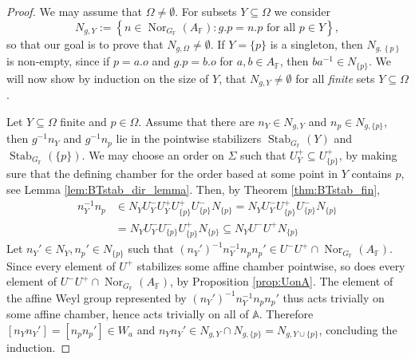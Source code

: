 \documentclass[10pt,a4paper]{amsart}
\newcommand{\A}{\mathbb{A}}
\newcommand{\F}{\mathbb{F} }
\begin{document}
		\begin{proof}
			We may assume that $\Omega \neq \emptyset$. For subsets $Y \subseteq \Omega$ we consider
			$$
			N_{g,Y} := \left\{ n \in \operatorname{Nor}_{G_\F}(A_\F) \colon  g.p = n.p \text{ for all } p\in Y \right\},
			$$
			so that our goal is to prove that $N_{g,\Omega} \neq \emptyset$.
			If $Y=\{p\}$ is a singleton, then $N_{g,\left\{p\right\}}$ is non-empty, since if $p=a.o$ and $g.p = b.o$ for $a,b\in A_\F$, then $ba^{-1} \in N_{\{p\}}$. We will now show by induction on the size of $Y$, that $N_{g,Y} \neq \emptyset$ for all \emph{finite} sets $Y \subseteq \Omega$.
			
			Let $Y\subseteq \Omega$ finite and $p \in \Omega$. Assume that there are $n_{Y} \in N_{g,Y}$ and $n_p \in N_{g,\{p\}} $, then $g^{-1}n_Y$ and $g^{-1}n_p $ lie in the pointwise stabilizers $\operatorname{Stab}_{G_\F}(Y)$ and $ \operatorname{Stab}_{G_\F}(\{p\})$. We may choose an order on $\Sigma$ such that $U_{Y}^+ \subseteq U_{\{p\}}^+$, by making sure that the defining chamber for the	order based at some point in $Y$ contains $p$, see Lemma \ref{lem:BTstab_dir_lemma}.
			Then, by Theorem \ref{thm:BTstab_fin},
			\begin{align*}
				n_Y^{-1} n_p &\in N_Y U_Y^- U_Y^+ U_{\{p\}}^+ U_{\{p\}}^- N_{\{p\}} 
				=  N_Y U_{Y}^- U_{\{p\}}^+ U_{\{p\}}^- N_{\{p\}}\\
				&=  N_Y U_{Y}^- U_{\{p\}}^- U_{\{p\}}^+ N_{\{p\}}
				\subseteq N_Y U^- U^+ N_{\{p\}}
			\end{align*}
			Let $n_Y' \in N_Y, n_p' \in N_{\{p\}}$ such that $(n_Y')^{-1}n_Y^{-1}n_pn_p' \in U^{-} U^{+} \cap \operatorname{Nor}_{G_\F}(A_\F)$. %
			Since every element of $U^+$ stabilizes some affine chamber pointwise, so does every element of $U^-U^+ \cap \operatorname{Nor}_{G_\F}(A_\F)$, by Proposition \ref{prop:UonA}. The element of the affine Weyl group represented by $(n_Y')^{-1}n_Y^{-1}n_pn_p'$ thus acts trivially on some affine chamber, hence acts trivially on all of $\A$. 
			Therefore $[n_Yn_Y'] = [n_pn_p'] \in W_a$ and $ n_Y n_Y' \in N_{g,Y} \cap N_{g,\{p\}} = N_{g,Y\cup \{p\}}$, concluding the induction.
			

\end{proof}
\end{document}
